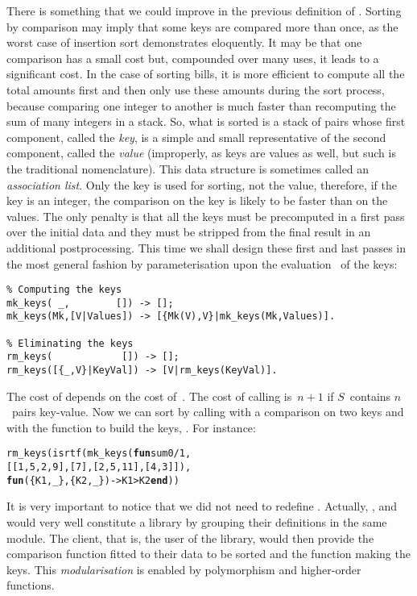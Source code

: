 \label{sorted_association_lists}

There is something that we could improve in the previous definition of
. Sorting by comparison may imply that some keys are
compared more than once, as the worst case of insertion sort
demonstrates eloquently. It may be that one comparison has a small
cost but, compounded over many uses, it leads to a significant
cost. In the case of sorting bills, it is more efficient to compute
all the total amounts first and then only use these amounts during the
sort process, because comparing one integer to another is much faster
than recomputing the sum of many integers in a stack. So, what is
sorted is a stack of pairs whose first component, called the
\emph{key}, is a simple and small representative of the second
component, called the \emph{value} (improperly, as keys are \Erlang
values as well, but such is the traditional nomenclature). This data
structure is sometimes called an \emph{association list}. Only the key
is used for sorting, not the value, therefore, if the key is an
integer, the comparison on the key is likely to be faster than on the
values. The only penalty is that all the keys must be precomputed in a
first pass over the initial data and they must be stripped from the
final result in an additional post\-processing. This time we shall
design these first and last passes in the most general fashion by
parameterisation upon the evaluation~ of the keys:
\begin{verbatim}
% Computing the keys
mk_keys( _,        []) -> [];
mk_keys(Mk,[V|Values]) -> [{Mk(V),V}|mk_keys(Mk,Values)].

% Eliminating the keys
rm_keys(            []) -> [];
rm_keys([{_,V}|KeyVal]) -> [V|rm_keys(KeyVal)].
\end{verbatim}
The cost of  depends on the cost
of~. The cost of calling  is~\(n+1\) if
\(S\)~contains \(n\)~pairs key\hyp{}value. Now we can sort by calling
 with a comparison on two keys and with the function
to build the keys, . For instance:
\begin{alltt}
 rm\_keys(isrtf(mk\_keys(\textbf{fun} sum0/1,
                       [[1,5,2,9],[7],[2,5,11],[4,3]]),
               \textbf{fun}(\{K1,\_\},\{K2,\_\}) -> K1 > K2 \textbf{end}))
\end{alltt}
It is very important to notice that we did not need to redefine
. Actually, , 
and  would very well constitute a library by
grouping their definitions in the same module. The client, that is,
the user of the library, would then provide the comparison function
fitted to their data to be sorted and the function making the keys. This
\emph{modularisation} is enabled by polymorphism and higher\hyp{}order
functions.

